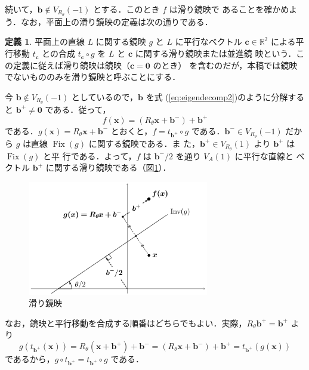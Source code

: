 \documentclass[11pt, uplatex, dvipdfmx, titlepage]{jsarticle}
\DeclareMathOperator{\Fix}{Fix}
\theoremstyle{definition}
\newtheorem*{definition}{定義}
\begin{document}
続いて，$\bm{b} \notin V_{R_{\theta}}(-1)$ とする．このとき $f$ は滑り鏡映で
あることを確かめよう．なお，平面上の滑り鏡映の定義は次の通りである．

\begin{definition}
  平面上の直線 $L$ に関する鏡映 $g$ と $L$ に平行なベクトル $\bm{c}
  \in \mathbb{R}^2$ による平行移動 $t_{\bm{c}}$ との合成 $t_{\bm{c}}
  \circ g$ を $L$ と $\bm{c}$ に関する滑り鏡映または並進鏡
  映という．この定義に従えば滑り鏡映は鏡映（$\bm{c}=\bm{0}$ のとき）
  を含むのだが，本稿では鏡映でないもののみを滑り鏡映と呼ぶことにする．
\end{definition}


今 $\bm{b} \notin V_{R_{\theta}}(-1)$ としているので，$\bm{b}$ を式 (\ref{eq:eigendecomp2})のように分解する
と $\bm{b}^{+} \neq \bm{0}$ である．従って，
\[
  f(\bm{x}) = \left(R_{\theta}\bm{x} + \bm{b}^{-}\right) + \bm{b}^{+}
\]
である．$g(\bm{x}) = R_{\theta}\bm{x}+\bm{b}^{-}$
とおくと，$f= t_{\bm{b}^{+}} \circ g$ である．$\bm{b}^{-} \in
V_{R_{\theta}}(-1)$ だから $g$ は直線 $\Fix(g)$ に関する鏡映である．ま
た，$\bm{b}^{+} \in V_{R_{\theta}}(1)$ より $\bm{b}^{+}$ は $\Fix(g)$ と平
行である．よって，$f$ は $\bm{b}^{-}/2$ を通り $V_A(1)$ に平行な直線と
ベクトル $\bm{b}^{+}$ に関する滑り鏡映である（図\ref{fig:glide2}）．
 \begin{figure}[h]
   \centering
   \includegraphics[height=5cm]{pictures/glide2.pdf}
   \caption{滑り鏡映}
   \label{fig:glide2}
 \end{figure}

 なお，鏡映と平行移動を合成する順番はどちらでもよい．実際，$R_{\theta}\bm{b}^{+}=\bm{b}^{+}$ より
\[
  g \left(t_{\bm{b}^{+}}(\bm{x})\right) = R_{\theta}\left(\bm{x} + \bm{b}^{+}\right) + \bm{b}^{-}
  = \left(R_{\theta}\bm{x} + \bm{b}^{-}\right) + \bm{b}^{+} = t_{\bm{b}^{+}}\left(g(\bm{x})\right)
\]
であるから，$g \circ t_{\bm{b}^{+}} = t_{\bm{b}^{+}} \circ g$ である．
\end{document}
